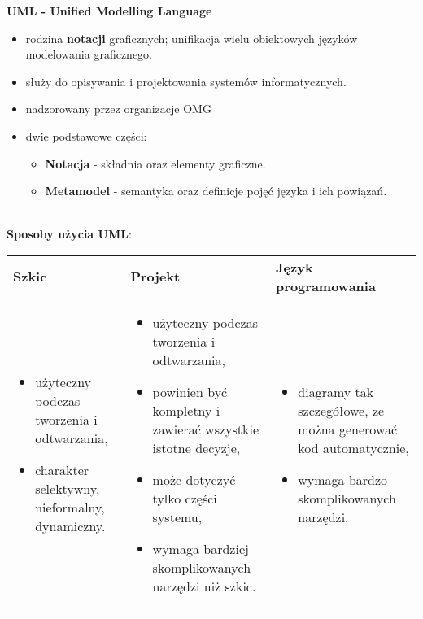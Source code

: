 \documentclass[../main.tex]{subfiles}
\begin{document}
    \textbf{UML - Unified Modelling Language}
    \begin{itemize}
        \item rodzina \textbf{notacji} graficznych; unifikacja wielu obiektowych języków modelowania graficznego.
        \item służy do opisywania i projektowania systemów informatycznych.
        \item nadzorowany przez organizacje OMG
        \item dwie podstawowe części:
        \begin{itemize}
            \item \textbf{Notacja} - składnia oraz elementy graficzne.
            \item \textbf{Metamodel} - semantyka oraz definicje pojęć języka i ich powiązań.
        \end{itemize}
    \end{itemize}
    \hfill \\
    \textbf{Sposoby użycia UML}:

    \begin{table}[H]
        \begin{center}
            \begin{tabular}{  p{5cm} p{5cm}  p{5cm} }
                \toprule
                \textbf{Szkic} & \textbf{Projekt} & \textbf{Język programowania}\\

                \cmidrule(r){1-1}\cmidrule(rl){2-2}\cmidrule(l){3-3}

                \begin{itemize}
                    \item użyteczny podczas tworzenia i odtwarzania,
                    \item charakter selektywny, nieformalny, dynamiczny.
                \end{itemize}
                &
                \begin{itemize}
                    \item użyteczny podczas tworzenia i odtwarzania,
                    \item powinien być kompletny i zawierać wszystkie istotne decyzje,
                    \item może dotyczyć tylko części systemu,
                    \item wymaga bardziej skomplikowanych narzędzi niż szkic.
                \end{itemize}
                &
                \begin{itemize}
                    \item diagramy tak szczegółowe, ze można generować kod automatycznie,
                    \item wymaga bardzo skomplikowanych narzędzi.
                \end{itemize}
                \\


                \bottomrule
            \end{tabular}
        \end{center}
    \end{table}
\end{document}
